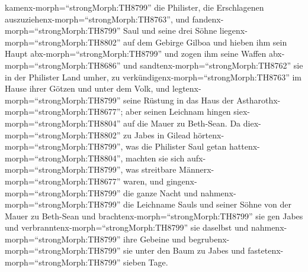 kamenx-morph=``strongMorph:TH8799'' die Philister, die Erschlagenen
auszuziehenx-morph=``strongMorph:TH8763'', und
fandenx-morph=``strongMorph:TH8799'' Saul und seine drei Söhne
liegenx-morph=``strongMorph:TH8802'' auf dem Gebirge Gilboa 
und hieben ihm sein Haupt abx-morph=``strongMorph:TH8799'' und zogen ihm
seine Waffen abx-morph=``strongMorph:TH8686'' und
sandtenx-morph=``strongMorph:TH8762'' sie in der Philister Land umher,
zu verkündigenx-morph=``strongMorph:TH8763'' im Hause ihrer Götzen und
unter dem Volk,  und legtenx-morph=``strongMorph:TH8799''
seine Rüstung in das Haus der Astharothx-morph=``strongMorph:TH8677'';
aber seinen Leichnam hingen siex-morph=``strongMorph:TH8804'' auf die
Mauer zu Beth-Sean.  Da diex-morph=``strongMorph:TH8802''
zu Jabes in Gilead hörtenx-morph=``strongMorph:TH8799'', was die
Philister Saul getan hattenx-morph=``strongMorph:TH8804'', 
machten sie sich aufx-morph=``strongMorph:TH8799'', was streitbare
Männerx-morph=``strongMorph:TH8677'' waren, und
gingenx-morph=``strongMorph:TH8799'' die ganze Nacht und
nahmenx-morph=``strongMorph:TH8799'' die Leichname Sauls und seiner
Söhne von der Mauer zu Beth-Sean und
brachtenx-morph=``strongMorph:TH8799'' sie gen Jabes und
verbranntenx-morph=``strongMorph:TH8799'' sie daselbst  und
nahmenx-morph=``strongMorph:TH8799'' ihre Gebeine und
begrubenx-morph=``strongMorph:TH8799'' sie unter den Baum zu Jabes und
fastetenx-morph=``strongMorph:TH8799'' sieben Tage.
